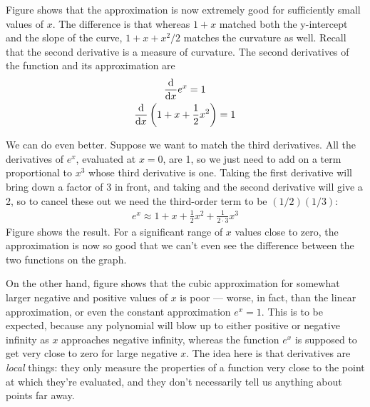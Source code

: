 
Figure  shows that the approximation is now extremely good for sufficiently small values of $x$.
The difference is that whereas $1+x$ matched both the y-intercept and the slope of the curve, $1+x+x^2/2$ matches
the curvature as well. Recall that the second derivative is a measure of curvature. The second derivatives of the
function and its approximation are
\begin{gather*}
  \frac{\textup{d}}{\textup{d} x} e^x = 1\\
  \frac{\textup{d}}{\textup{d} x} \left(1+x+\frac{1}{2}x^2\right) = 1
\end{gather*}

%
We can do even better. Suppose we want to match the third derivatives. All the derivatives of $e^x$, evaluated
at $x=0$, are 1, so we just need to add on a term proportional to $x^3$ whose third derivative is one. Taking the
first derivative will bring down a factor of 3 in front, and taking and the second derivative will give a 2, so
to cancel these out we need the third-order term to be $(1/2)(1/3)$:
\begin{align*}
  e^x \approx 1+x+\frac{1}{2}x^2+\frac{1}{2\cdot3}x^3
\end{align*}
Figure  shows the result. For a significant range of $x$ values close to zero, the approximation is
now so good that we can't even see the difference between the two functions on the graph.

 On the other hand, figure  shows that 
the cubic approximation for somewhat larger negative and positive values of $x$ is poor --- worse, in fact, than the
linear approximation, or even the constant approximation $e^x=1$. This is to be expected, because
any polynomial will blow up to either positive or negative infinity as $x$ approaches negative infinity, whereas
the function $e^x$ is supposed to get very close to zero for large negative $x$. The idea here is that derivatives
are \emph{local} things: they only measure the properties of a function very close to the point at which they're
evaluated, and they don't necessarily tell us anything about points far away.
%

